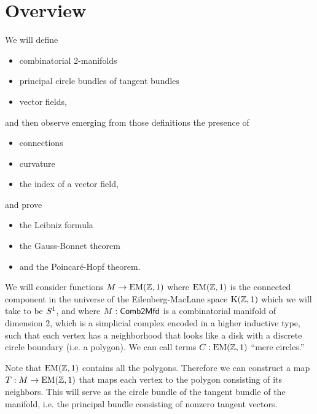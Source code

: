 \section{Overview}
We will define 
\begin{itemize}
\item combinatorial 2-manifolds
\item principal circle bundles of tangent bundles
\item vector fields,
\end{itemize}
and then observe emerging from those definitions the presence of
\begin{itemize}
\item connections
\item curvature
\item the index of a vector field,
\end{itemize}
and prove
\begin{itemize}
\item the Leibniz formula
\item the Gauss-Bonnet theorem
\item and the Poincaré-Hopf theorem.
\end{itemize}

We will consider functions \( M\to \mathrm{EM}(\mathbb{Z},1) \) where \( \mathrm{EM}(\mathbb{Z},1) \) is the connected component in the universe of the Eilenberg-MacLane space \( \mathrm{K}(\mathbb{Z},1) \) which we will take to be \( S^1 \), and where \( M:\mathsf{Comb2Mfd} \) is a combinatorial manifold of dimension 2, which is a simplicial complex encoded in a higher inductive type, such that each vertex has a neighborhood that looks like a disk with a discrete circle boundary (i.e. a polygon). We can call terms \( C:\mathrm{EM}(\mathbb{Z},1) \) ``mere circles.''

Note that \( \mathrm{EM}(\mathbb{Z},1) \) contains all the polygons. Therefore we can construct a map \( T:M\to\mathrm{EM}(\mathbb{Z},1) \) that maps each vertex to the polygon consisting of its neighbors. This will serve as the circle bundle of the tangent bundle of the manifold, i.e. the principal bundle consisting of nonzero tangent vectors.


